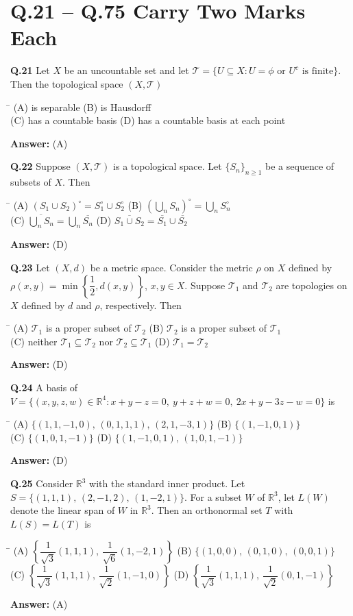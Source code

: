 \documentclass[11pt,a4paper]{article}
\newcommand{\optsfourA}[4]{%
  \begin{tabbing}
    \hspace{0.48\linewidth}\=\kill
    (A) #1 \> (B) #2 \\[2pt]
    (C) #3 \> (D) #4
  \end{tabbing}%
}
\newcommand{\ans}[1]{\textbf{Answer:} #1\par\medskip}
\begin{document}
\section*{Q.21 -- Q.75 Carry Two Marks Each}

\textbf{Q.21} Let $X$ be an uncountable set and let $\mathcal{T} = \{U \subseteq X : U = \phi \text{ or } U^c \text{ is finite}\}$. Then the topological space $(X, \mathcal{T})$
\optsfourA{is separable}{is Hausdorff}{has a countable basis}{has a countable basis at each point}
\ans{(A)}

\textbf{Q.22} Suppose $(X, \mathcal{T})$ is a topological space. Let $\{S_n\}_{n \ge 1}$ be a sequence of subsets of $X$. Then
\optsfourA{$(S_1 \cup S_2)^\circ = S_1^\circ \cup S_2^\circ$}{$\left(\displaystyle\bigcup_n S_n\right)^\circ = \displaystyle\bigcup_n S_n^\circ$}{$\overline{\displaystyle\bigcup_n S_n} = \displaystyle\bigcup_n \overline{S_n}$}{$\overline{S_1 \cup S_2} = \overline{S_1} \cup \overline{S_2}$}
\ans{(D)}

\textbf{Q.23} Let $(X, d)$ be a metric space. Consider the metric $\rho$ on $X$ defined by $\rho(x, y) = \min\left\{\dfrac{1}{2}, d(x, y)\right\}$, $x, y \in X$. Suppose $\mathcal{T}_1$ and $\mathcal{T}_2$ are topologies on $X$ defined by $d$ and $\rho$, respectively. Then
\optsfourA{$\mathcal{T}_1$ is a proper subset of $\mathcal{T}_2$}{$\mathcal{T}_2$ is a proper subset of $\mathcal{T}_1$}{neither $\mathcal{T}_1 \subseteq \mathcal{T}_2$ nor $\mathcal{T}_2 \subseteq \mathcal{T}_1$}{$\mathcal{T}_1 = \mathcal{T}_2$}
\ans{(D)}

\textbf{Q.24} A basis of $V = \{(x,y,z,w) \in \mathbb{R}^4 : x + y - z = 0,\ y + z + w = 0,\ 2x + y - 3z - w = 0\}$ is
\optsfourA{$\{(1,1,-1,0),\, (0,1,1,1),\, (2,1,-3,1)\}$}{$\{(1,-1,0,1)\}$}{$\{(1,0,1,-1)\}$}{$\{(1,-1,0,1),\, (1,0,1,-1)\}$}
\ans{(D)}

\textbf{Q.25} Consider $\mathbb{R}^3$ with the standard inner product. Let $S = \{(1,1,1),\, (2,-1,2),\, (1,-2,1)\}$. For a subset $W$ of $\mathbb{R}^3$, let $L(W)$ denote the linear span of $W$ in $\mathbb{R}^3$. Then an orthonormal set $T$ with $L(S) = L(T)$ is
\optsfourA{$\left\{\dfrac{1}{\sqrt{3}}(1,1,1),\, \dfrac{1}{\sqrt{6}}(1,-2,1)\right\}$}{$\{(1,0,0),\, (0,1,0),\, (0,0,1)\}$}{$\left\{\dfrac{1}{\sqrt{3}}(1,1,1),\, \dfrac{1}{\sqrt{2}}(1,-1,0)\right\}$}{$\left\{\dfrac{1}{\sqrt{3}}(1,1,1),\, \dfrac{1}{\sqrt{2}}(0,1,-1)\right\}$}
\ans{(A)}
\end{document}
